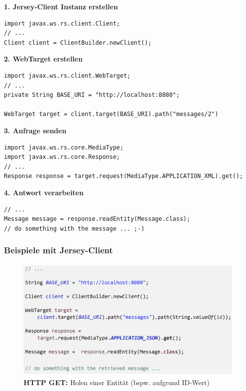 \documentclass[a4paper]{article}
\begin{document}
				\textbf{1. Jersey-Client Instanz erstellen}
				
				\begin{lstlisting}
import javax.ws.rs.client.Client;
// ...
Client client = ClientBuilder.newClient();
				\end{lstlisting}
				
				\textbf{2. WebTarget erstellen}
				
				\begin{lstlisting}
import javax.ws.rs.client.WebTarget;
// ...
private String BASE_URI = "http://localhost:8080";

WebTarget target = client.target(BASE_URI).path("messages/2")
				\end{lstlisting}
					
				\textbf{3. Anfrage senden}
				
				\begin{lstlisting}
import javax.ws.rs.core.MediaType;
import javax.ws.rs.core.Response;
// ...
Response response = target.request(MediaType.APPLICATION_XML).get();
				\end{lstlisting}
					
				\textbf{4. Antwort verarbeiten}
				
				\begin{lstlisting}
// ...
Message message = response.readEntity(Message.class);
// do something with the message ... ;-)
				\end{lstlisting}
					
			\subsubsection{Beispiele mit Jersey-Client}
			
				\begin{figure}[!htb]
					\centering
					\includegraphics[keepaspectratio, height=6cm]{img/ws/jersey_01.png}
					\caption{\textbf{HTTP GET:} Holen einer Entität (bspw. aufgrund ID-Wert)}
					\label{fig:jersey_httpget1}
				\end{figure}
			
\end{document}
